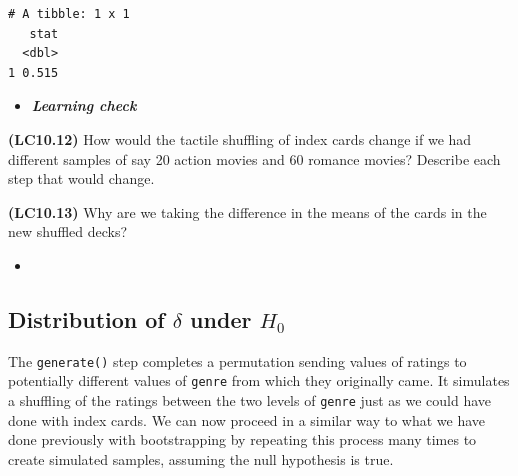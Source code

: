 \documentclass[12pt, krantz2,]{krantz}
\makeatletter
\newenvironment{Shaded}{\begin{snugshade}}{\end{snugshade}}
\newcommand{\DataTypeTok}[1]{\textcolor[rgb]{0.27,0.27,0.27}{#1}}
\newcommand{\DecValTok}[1]{\textcolor[rgb]{0.06,0.06,0.06}{#1}}
\newcommand{\KeywordTok}[1]{\textcolor[rgb]{0.27,0.27,0.27}{\textbf{#1}}}
\newcommand{\NormalTok}[1]{#1}
\newcommand{\OperatorTok}[1]{\textcolor[rgb]{0.43,0.43,0.43}{\textbf{#1}}}
\newcommand{\StringTok}[1]{\textcolor[rgb]{0.5,0.5,0.5}{#1}}
\newenvironment{kframe}{%
\medskip{}
\setlength{\fboxsep}{.8em}
 \def\at@end@of@kframe{}%
 \ifinner\ifhmode%
  \def\at@end@of@kframe{\end{minipage}}%
  \begin{minipage}{\columnwidth}%
 \fi\fi%
 \def\FrameCommand##1{\hskip\@totalleftmargin \hskip-\fboxsep
 \colorbox{shadecolor}{##1}\hskip-\fboxsep
     \hskip-\linewidth \hskip-\@totalleftmargin \hskip\columnwidth}%
 \MakeFramed {\advance\hsize-\width
   \@totalleftmargin\z@ \linewidth\hsize
   \@setminipage}}%
 {\par\unskip\endMakeFramed%
 \at@end@of@kframe}
\renewenvironment{Shaded}{\begin{kframe}}{\end{kframe}}
\newenvironment{rmdblock}[1]
  {\begin{shaded*}
  \begin{itemize}
  \renewcommand{\labelitemi}{
    \raisebox{-.7\height}[0pt][0pt]{
    }
  }
  \item
  }
  {
  \end{itemize}
  \end{shaded*}
  }
\newenvironment{learncheck}
  {\begin{rmdblock}{warning}}
  {\end{rmdblock}}
\makeatother
\begin{document}
\begin{Shaded}
\end{Shaded}

\begin{verbatim}
# A tibble: 1 x 1
   stat
  <dbl>
1 0.515
\end{verbatim}

\begin{learncheck}
\textbf{\emph{Learning check}}
\end{learncheck}

\textbf{(LC10.12)} How would the tactile shuffling of index cards change if we had different samples of say 20 action movies and 60 romance movies? Describe each step that would change.

\textbf{(LC10.13)} Why are we taking the difference in the means of the cards in the new shuffled decks?

\begin{learncheck}

\end{learncheck}

\hypertarget{distribution-of-delta-under-h_0}{%
\subsection{\texorpdfstring{Distribution of \(\delta\) under \(H_0\)}{Distribution of \textbackslash{}delta under H\_0}}\label{distribution-of-delta-under-h_0}}

The \texttt{generate()} step completes a permutation sending values of ratings to potentially different values of \texttt{genre} from which they originally came. It simulates a shuffling of the ratings between the two levels of \texttt{genre} just as we could have done with index cards. We can now proceed in a similar way to what we have done previously with bootstrapping by repeating this process many times to create simulated samples, assuming the null hypothesis is true.
\end{document}
